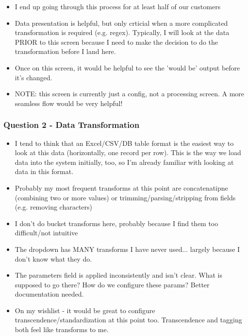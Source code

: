 \documentclass[12pt,letterpaper]{article}
\begin{document}
\begin{itemize}
    \item I end up going through this process for at least half of our customers
    \item Data presentation is helpful, but only crticial when a more complicated transformation is required (e.g. regex). Typically, I will look at the data PRIOR to this screen because I need to make the decision to do the transformation before I land here. 
    \item Once on this screen, it would be helpful to see the 'would be' output before it's changed.
    \item NOTE: this screen is currently just a config, not a processing screen. A more seamless flow would be very helpful!
\end{itemize}

\subsubsection*{Question 2 - Data Transformation}
\begin{itemize}
    \item I tend to think that an Excel/CSV/DB table format is the easiest way to look at this data (horizontally, one record per row). This is the way we load data into the system initially, too, so I'm already familiar with looking at data in this format. 
    \item Probably my most frequent transforms at this point are concatenatipne (combining two or more values) or trimming/parsing/stripping from fields (e.g. removing characters)
    \item I don't do bucket transforms here, probably because I find them too difficult/not intuitive
    \item The dropdown has MANY transforms I have never used... largely because I don't know what they do. 
    \item The parameters field is applied inconsistently and isn't clear. What is supposed to go there? How do we configure these params? Better documentation needed.
    \item On my wishlist - it would be great to configure transcendence/standardization at this point too. Transcendence and tagging both feel like transforms to me.
\end{itemize}
\end{document}
